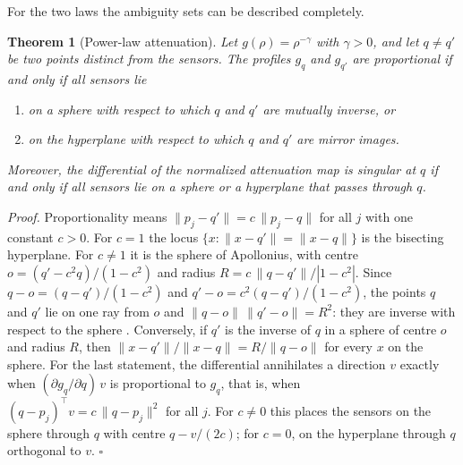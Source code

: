 \documentclass{article}
\newtheorem{theorem}{\bf Theorem}
\begin{document}
For the two laws the ambiguity sets can be described completely.

\begin{theorem}[Power-law attenuation] \label{thm:power-law}
Let $g(\rho) = \rho^{-\gamma}$ with $\gamma > 0$, and let $q \neq q'$ be two points distinct from the sensors. The profiles $g_q$ and $g_{q'}$ are proportional if and only if all sensors lie

\begin{enumerate}
\renewcommand{\labelenumi}{(\alph{enumi})}
\item
  on a sphere with respect to which $q$ and $q'$ are mutually inverse, or
\item
  on the hyperplane with respect to which $q$ and $q'$ are mirror images.
\end{enumerate}

Moreover, the differential of the normalized attenuation map is singular at $q$ if and only if all sensors lie on a sphere or a hyperplane that passes through $q$.
\end{theorem}

\textit{Proof.} Proportionality means $\lVert p_j - q' \rVert = c\, \lVert p_j - q \rVert$ for all $j$ with one constant $c > 0$. For $c = 1$ the locus $\{x : \lVert x - q' \rVert = \lVert x - q \rVert\}$ is the bisecting hyperplane. For $c \neq 1$ it is the sphere of Apollonius, with centre $o = (q' - c^2 q)/(1 - c^2)$ and radius $R = c\, \lVert q - q' \rVert / |1 - c^2|$. Since $q - o = (q - q')/(1 - c^2)$ and $q' - o = c^2 (q - q')/(1 - c^2)$, the points $q$ and $q'$ lie on one ray from $o$ and $\lVert q - o \rVert\, \lVert q' - o \rVert = R^2$: they are inverse with respect to the sphere \cite{ref-Coxeter}. Conversely, if $q'$ is the inverse of $q$ in a sphere of centre $o$ and radius $R$, then $\lVert x - q' \rVert / \lVert x - q \rVert = R / \lVert q - o \rVert$ for every $x$ on the sphere. For the last statement, the differential annihilates a direction $v$ exactly when $(\partial g_q / \partial q)\, v$ is proportional to $g_q$, that is, when $(q - p_j)^{\top} v = c\, \lVert q - p_j \rVert^{2}$ for all $j$. For $c \neq 0$ this places the sensors on the sphere through $q$ with centre $q - v/(2c)$; for $c = 0$, on the hyperplane through $q$ orthogonal to $v$. $\square$
\end{document}
